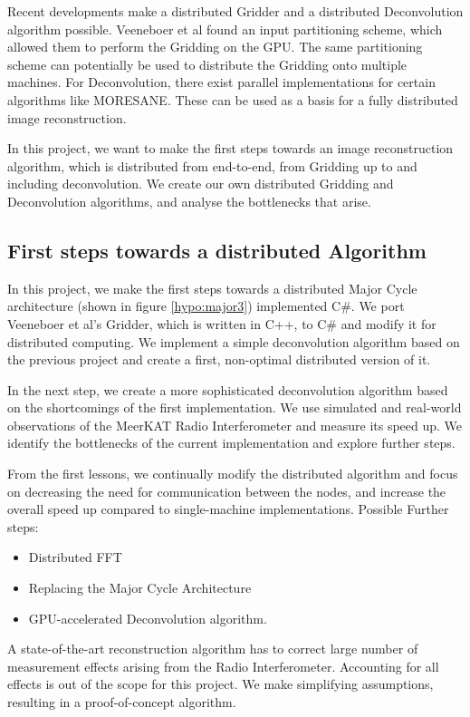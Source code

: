 Recent developments make a distributed Gridder and a distributed Deconvolution algorithm possible. Veeneboer et al\cite{veenboer2017image} found an input partitioning scheme, which allowed them to perform the Gridding on the GPU. The same partitioning scheme can potentially be used to distribute the Gridding onto multiple machines. For Deconvolution, there exist parallel implementations for certain algorithms like MORESANE\cite{dabbech2015moresane}. These can be used as a basis for a fully distributed image reconstruction.

In this project, we want to make the first steps towards an image reconstruction algorithm, which is distributed from end-to-end, from Gridding up to and including deconvolution. We create our own distributed Gridding and Deconvolution algorithms, and analyse the bottlenecks that arise.

\subsection{First steps towards a distributed Algorithm}
In this project, we make the first steps towards a distributed Major Cycle architecture (shown in figure \ref{hypo:major3}) implemented C\#. We port Veeneboer et al's Gridder, which is written in C++, to C\# and modify it for distributed computing. We implement a simple deconvolution algorithm based on the previous project and create a first, non-optimal distributed version of it.

In the next step, we create a more sophisticated deconvolution algorithm based on the shortcomings of the first implementation. We use simulated and real-world observations of the MeerKAT Radio Interferometer and measure its speed up. We identify the bottlenecks of the current implementation and explore further steps.

From the first lessons, we continually modify the distributed algorithm and focus on decreasing the need for communication between the nodes, and increase the overall speed up compared to single-machine implementations. Possible Further steps:
\begin{itemize}
	\item Distributed FFT
	\item Replacing the Major Cycle Architecture
	\item GPU-accelerated Deconvolution algorithm.
\end{itemize}

A state-of-the-art reconstruction algorithm has to correct large number of measurement effects arising from the Radio Interferometer. Accounting for all effects is out of the scope for this project. We make simplifying assumptions, resulting in a proof-of-concept algorithm.